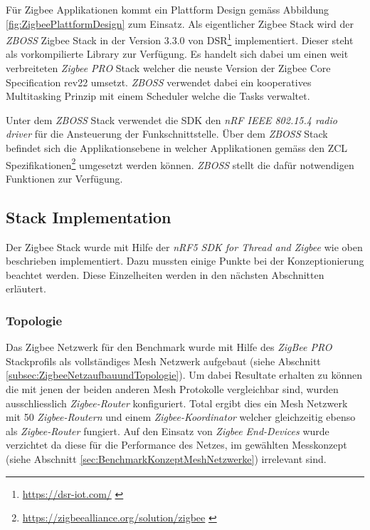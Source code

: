Für Zigbee Applikationen kommt ein Plattform Design gemäss Abbildung \ref{fig:ZigbeePlattformDesign} zum Einsatz. 
Als eigentlicher Zigbee Stack wird der \textit{ZBOSS} Zigbee Stack in der Version 3.3.0 von DSR\footnote{\url{https://dsr-iot.com/} \cite{dsr_corporation_dsr_nodate}} implementiert.
Dieser steht als vorkompilierte Library zur Verfügung. 
Es handelt sich dabei um einen weit verbreiteten \textit{Zigbee PRO} Stack welcher die neuste Version der Zigbee Core Specification rev22 umsetzt.
\textit{ZBOSS} verwendet dabei ein kooperatives Multitasking Prinzip mit einem Scheduler welche die Tasks verwaltet.

Unter dem \textit{ZBOSS} Stack verwendet die SDK den \textit{nRF IEEE 802.15.4 radio driver} für die Ansteuerung der Funkschnittstelle.
Über dem \textit{ZBOSS} Stack befindet sich die Applikationsebene in welcher Applikationen gemäss den ZCL Spezifikationen\footnote{\url{https://zigbeealliance.org/solution/zigbee} \cite{the_zigbee_alliance_zigbee_2016}} umgesetzt werden können.
\textit{ZBOSS} stellt die dafür notwendigen Funktionen zur Verfügung.


\subsection{Stack Implementation}\label{subsec:ZigbeeStackImplementation}
Der Zigbee Stack wurde mit Hilfe der \textit{nRF5 SDK for Thread and Zigbee} wie oben beschrieben implementiert.
Dazu mussten einige Punkte bei der Konzeptionierung beachtet werden.
Diese Einzelheiten werden in den nächsten Abschnitten erläutert.

\subsubsection{Topologie}\label{subsubsec:ZigbeeTopologie}
Das Zigbee Netzwerk für den Benchmark wurde mit Hilfe des \textit{ZigBee PRO} Stackprofils als vollständiges Mesh Netzwerk aufgebaut (siehe Abschnitt \ref{subsec:ZigbeeNetzaufbauundTopologie}).
Um dabei Resultate erhalten zu können die mit jenen der beiden anderen Mesh Protokolle vergleichbar sind, wurden ausschliesslich \textit{Zigbee-Router} konfiguriert.
Total ergibt dies ein Mesh Netzwerk mit 50 \textit{Zigbee-Routern} und einem \textit{Zigbee-Koordinator} welcher gleichzeitig ebenso als \textit{Zigbee-Router} fungiert.
Auf den Einsatz von \textit{Zigbee End-Devices} wurde verzichtet da diese für die Performance des Netzes, im gewählten Messkonzept (siehe Abschnitt \ref{sec:BenchmarkKonzeptMeshNetzwerke}) irrelevant sind.

